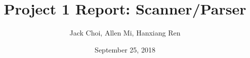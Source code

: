 \title{Project 1 Report: Scanner/Parser}
\author{Jack Choi, Allen Mi, Hanxiang Ren}
\date{September 25, 2018}
\newcommand{\reportfile}{scalars_report_1.tex}